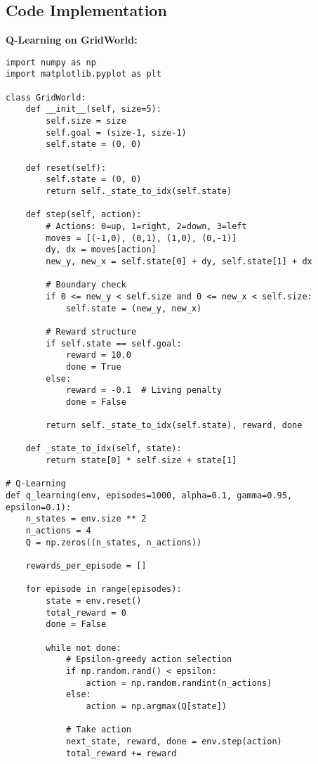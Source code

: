 \subsection{Code Implementation}

\begin{codebox}
\textbf{Q-Learning on GridWorld:}

\begin{lstlisting}
import numpy as np
import matplotlib.pyplot as plt

class GridWorld:
    def __init__(self, size=5):
        self.size = size
        self.goal = (size-1, size-1)
        self.state = (0, 0)
        
    def reset(self):
        self.state = (0, 0)
        return self._state_to_idx(self.state)
    
    def step(self, action):
        # Actions: 0=up, 1=right, 2=down, 3=left
        moves = [(-1,0), (0,1), (1,0), (0,-1)]
        dy, dx = moves[action]
        new_y, new_x = self.state[0] + dy, self.state[1] + dx
        
        # Boundary check
        if 0 <= new_y < self.size and 0 <= new_x < self.size:
            self.state = (new_y, new_x)
        
        # Reward structure
        if self.state == self.goal:
            reward = 10.0
            done = True
        else:
            reward = -0.1  # Living penalty
            done = False
            
        return self._state_to_idx(self.state), reward, done
    
    def _state_to_idx(self, state):
        return state[0] * self.size + state[1]

# Q-Learning
def q_learning(env, episodes=1000, alpha=0.1, gamma=0.95, epsilon=0.1):
    n_states = env.size ** 2
    n_actions = 4
    Q = np.zeros((n_states, n_actions))
    
    rewards_per_episode = []
    
    for episode in range(episodes):
        state = env.reset()
        total_reward = 0
        done = False
        
        while not done:
            # Epsilon-greedy action selection
            if np.random.rand() < epsilon:
                action = np.random.randint(n_actions)
            else:
                action = np.argmax(Q[state])
            
            # Take action
            next_state, reward, done = env.step(action)
            total_reward += reward
            

\end{lstlisting}
\end{codebox}
